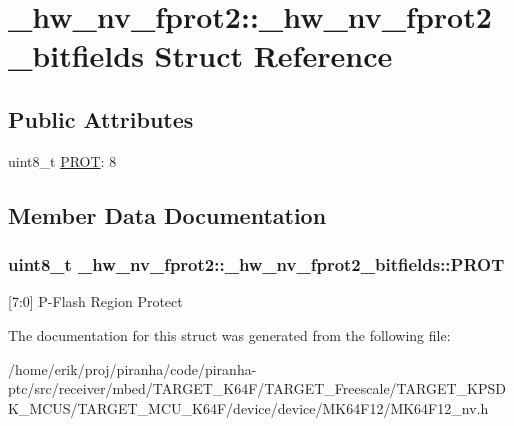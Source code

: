 \hypertarget{struct__hw__nv__fprot2_1_1__hw__nv__fprot2__bitfields}{}\section{\+\_\+hw\+\_\+nv\+\_\+fprot2\+:\+:\+\_\+hw\+\_\+nv\+\_\+fprot2\+\_\+bitfields Struct Reference}
\label{struct__hw__nv__fprot2_1_1__hw__nv__fprot2__bitfields}
\subsection*{Public Attributes}
\begin{DoxyCompactItemize}
\item 
uint8\+\_\+t \hyperlink{struct__hw__nv__fprot2_1_1__hw__nv__fprot2__bitfields_a1f9852118e26e72c3a26bbe6f3548ce0}{P\+R\+OT}\+: 8
\end{DoxyCompactItemize}


\subsection{Member Data Documentation}
\subsubsection[{\texorpdfstring{P\+R\+OT}{PROT}}]{\setlength{\rightskip}{0pt plus 5cm}uint8\+\_\+t \+\_\+hw\+\_\+nv\+\_\+fprot2\+::\+\_\+hw\+\_\+nv\+\_\+fprot2\+\_\+bitfields\+::\+P\+R\+OT}\hypertarget{struct__hw__nv__fprot2_1_1__hw__nv__fprot2__bitfields_a1f9852118e26e72c3a26bbe6f3548ce0}{}\label{struct__hw__nv__fprot2_1_1__hw__nv__fprot2__bitfields_a1f9852118e26e72c3a26bbe6f3548ce0}
\mbox{[}7\+:0\mbox{]} P-\/\+Flash Region Protect 

The documentation for this struct was generated from the following file\+:\begin{DoxyCompactItemize}
\item 
/home/erik/proj/piranha/code/piranha-\/ptc/src/receiver/mbed/\+T\+A\+R\+G\+E\+T\+\_\+\+K64\+F/\+T\+A\+R\+G\+E\+T\+\_\+\+Freescale/\+T\+A\+R\+G\+E\+T\+\_\+\+K\+P\+S\+D\+K\+\_\+\+M\+C\+U\+S/\+T\+A\+R\+G\+E\+T\+\_\+\+M\+C\+U\+\_\+\+K64\+F/device/device/\+M\+K64\+F12/M\+K64\+F12\+\_\+nv.\+h\end{DoxyCompactItemize}
